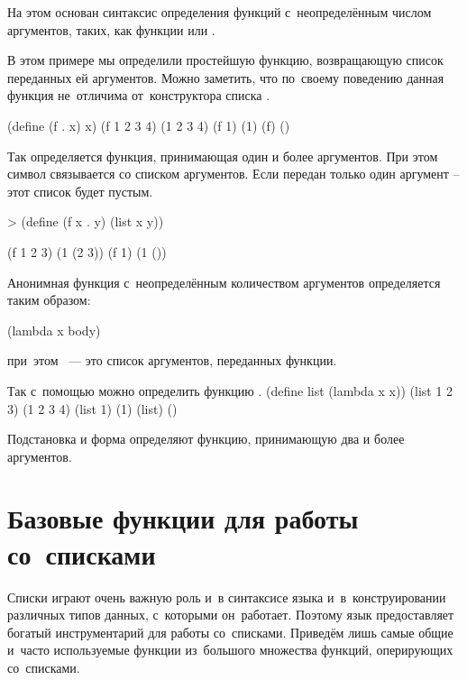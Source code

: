 На этом основан синтаксис определения функций с~неопределённым числом аргументов, таких, как функции \s{+} или \s{-}.

\begin{example}{%
В этом примере мы определили простейшую функцию, возвращающую список переданных ей аргументов. Можно заметить, что по~своему поведению данная функция не~отличима от~конструктора списка .}

\REPLin
  {(define (f . x) x)}
\REPL
  {(f 1 2 3 4)}
  {(1 2 3 4)}
\REPL
  {(f 1)}
  {(1)}
\REPL
  {(f)}
  {()}
\end{example}
\vspace{-\bigskipamount}
\begin{example}{%
Так определяется функция, принимающая один и более аргументов. При этом символ  связывается со списком аргументов. Если передан только один аргумент -- этот список будет пустым.}

\begin{ExampleCode}[emph={x,y}]
> (define (f x . y)
    (list x y))
\end{ExampleCode}
\REPL
  {(f 1 2 3)}
  {(1 (2 3))}
\REPL
  {(f 1)}
  {(1 ())}
\end{example}

Анонимная функция с~неопределённым количеством аргументов определяется таким образом:
\begin{SchemeCode}[emph={x}]
        (lambda x body) %
\end{SchemeCode}
\noindent при~этом ~--- это список аргументов, переданных функции.

\begin{example}{%
Так с~помощью  можно определить функцию .}
\REPLin
  {(define list (lambda x x))}
\REPL
  {(list 1 2 3)}
  {(1 2 3 4)}
\REPL
  {(list 1)}
  {(1)}
\REPL
  {(list)}
  {()}
\end{example}

\label{variadic-rewrite}Подстановка  и форма  определяют функцию, принимающую два и более аргументов.

\section[4]{Базовые функции для работы со~списками}%
Списки играют очень важную роль и~в синтаксисе языка \Scheme и~в~конструировании различных типов данных, с~которыми он~работает. Поэтому язык предоставляет богатый инструментарий для работы со~списками. Приведём лишь самые общие и~часто используемые функции из~большого множества функций, оперирующих со~списками.


